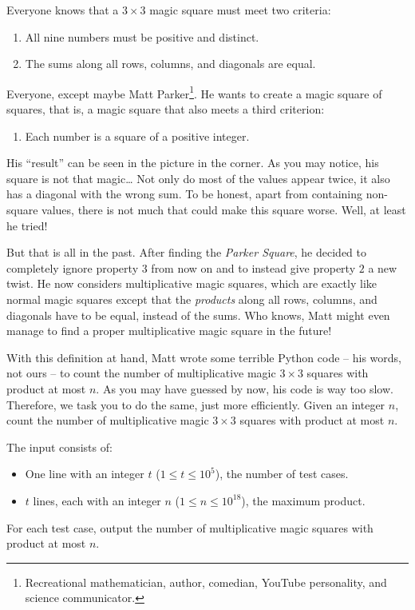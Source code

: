 \problemname{}


Everyone knows that a $3\times3$ magic square must meet two criteria:
\begin{enumerate}
	\item All nine numbers must be positive and distinct.
	\item The sums along all rows, columns, and diagonals are equal.
\end{enumerate}
Everyone, except  maybe Matt Parker\footnote{Recreational mathematician, author, comedian, YouTube personality, and science communicator.}.
He wants to create a magic square of squares, that is, a magic square that also meets a third criterion:
\begin{enumerate}[resume]
	\item Each number is a square of a positive integer.
\end{enumerate}
His ``result'' can be seen in the picture in the corner.
As you may notice, his square is not that magic\dots{}
Not only do most of the values appear twice, it also has a diagonal with the wrong sum.
To be honest, apart from containing non-square values, there is not much that could make this square worse.
Well, at least he tried!

But that is all in the past.
After finding the \emph{Parker Square}, he decided to completely ignore property $3$ from now on and to instead give property $2$ a new twist.
He now considers multiplicative magic squares, which are exactly like normal magic squares except that the \emph{products} along all rows, columns, and diagonals have to be equal, instead of the sums.
Who knows, Matt might even manage to find a proper multiplicative magic square in the future!

With this definition at hand, Matt wrote some terrible Python code -- his words, not ours -- to count the number of multiplicative magic $3\times 3$ squares with product at most $n$.
As you may have guessed by now, his code is way too slow.
Therefore, we task you to do the same, just more efficiently.
Given an integer $n$, count the number of multiplicative magic $3\times 3$ squares with product at most $n$.

\begin{Input}
	The input consists of:
	\begin{itemize}
		\item One line with an integer $t$ ($1 \leq t \leq 10^5$), the number of test cases.
    \item $t$ lines, each with an integer $n$ ($1 \leq n \leq 10^{18}$), the maximum product.
	\end{itemize}
\end{Input}

\begin{Output}
	For each test case, output the number of multiplicative magic squares with product at most $n$.
\end{Output}
